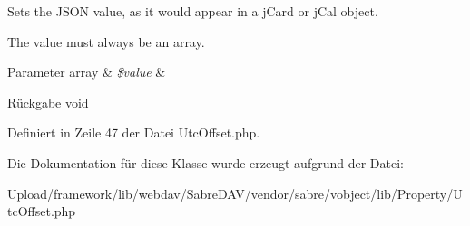 Sets the J\+S\+ON value, as it would appear in a j\+Card or j\+Cal object.

The value must always be an array.


\begin{DoxyParams}[1]{Parameter}
array & {\em \$value} & \\
\hline
\end{DoxyParams}
\begin{DoxyReturn}{Rückgabe}
void 
\end{DoxyReturn}


Definiert in Zeile 47 der Datei Utc\+Offset.\+php.



Die Dokumentation für diese Klasse wurde erzeugt aufgrund der Datei\+:\begin{DoxyCompactItemize}
\item 
Upload/framework/lib/webdav/\+Sabre\+D\+A\+V/vendor/sabre/vobject/lib/\+Property/Utc\+Offset.\+php\end{DoxyCompactItemize}
